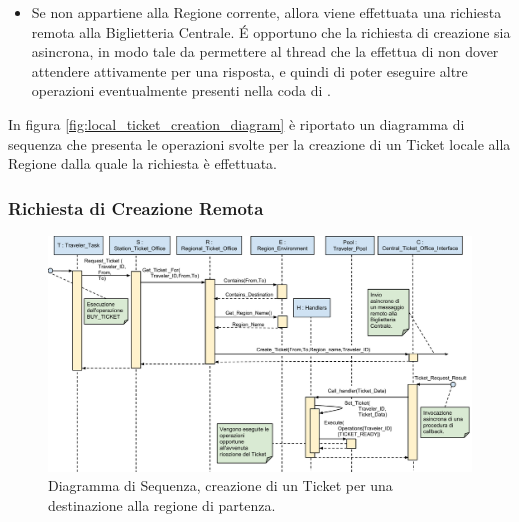 \begin{itemize}
\begin {itemize}
\begin{itemize}
\begin{verbatim}
						\end{verbatim}
						\item $i$ viene incrementato di $Max\_Length$, per poter procedere all'individuazione della prossima corrispondenza di lunghezza massima.
					\end{itemize} 
			\item Una volta creato il , allora se esso conterrà almeno una Tratta che prevede l'utilizzo di un Treno a prenotazione (ovvero di tipo ), allora si dovrà procedere alla , descritta nella sezione \ref{subsubsec:validation}.
			\item Altrimenti, il  creato viene assegnato al Viaggiatore e viene quindi inserita l'operazione  nella coda di operazioni di .
			\end {itemize} 
		\item Se  non appartiene alla Regione corrente, allora viene effettuata una richiesta remota alla Biglietteria Centrale. \'E opportuno che la richiesta di creazione sia asincrona, in modo tale da permettere al thread che la effettua di non dover attendere attivamente per una risposta, e quindi di poter eseguire altre operazioni eventualmente presenti nella coda di .
	\end{itemize} 
	
	In figura \ref{fig:local_ticket_creation_diagram} è riportato un diagramma di sequenza che presenta le operazioni svolte per la creazione di un Ticket locale alla Regione dalla quale la richiesta è effettuata. 


	\subsubsection {Richiesta di Creazione Remota}\label{subsubsec:remote_ticket_creation}
	
	
	\begin{figure}[htbp]
		\includegraphics[trim = 55mm 0mm 0mm 0mm,scale=0.5]{imgs/Buy_Ticket_Sequence_Diagram_Remote.pdf}
		\caption{\footnotesize{Diagramma di Sequenza, creazione di un Ticket per una destinazione  alla regione di partenza.}}
		\label{fig:remote_ticket_creation_diagram}
	\end{figure}
	
